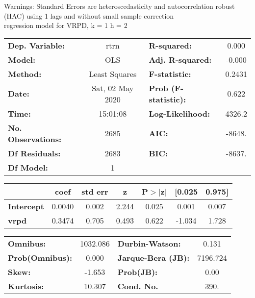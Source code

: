 Warnings: \newline
 [1] Standard Errors are heteroscedasticity and autocorrelation robust (HAC) using 1 lags and without small sample correction\\ 

regression model for VRPD, k = 1 h = 2\begin{center}
\begin{tabular}{lclc}
\toprule
\textbf{Dep. Variable:}    &       rtrn       & \textbf{  R-squared:         } &     0.000   \\
\textbf{Model:}            &       OLS        & \textbf{  Adj. R-squared:    } &    -0.000   \\
\textbf{Method:}           &  Least Squares   & \textbf{  F-statistic:       } &    0.2431   \\
\textbf{Date:}             & Sat, 02 May 2020 & \textbf{  Prob (F-statistic):} &    0.622    \\
\textbf{Time:}             &     15:01:08     & \textbf{  Log-Likelihood:    } &    4326.2   \\
\textbf{No. Observations:} &        2685      & \textbf{  AIC:               } &    -8648.   \\
\textbf{Df Residuals:}     &        2683      & \textbf{  BIC:               } &    -8637.   \\
\textbf{Df Model:}         &           1      & \textbf{                     } &             \\
\bottomrule
\end{tabular}
\begin{tabular}{lcccccc}
                   & \textbf{coef} & \textbf{std err} & \textbf{z} & \textbf{P$> |$z$|$} & \textbf{[0.025} & \textbf{0.975]}  \\
\midrule
\textbf{Intercept} &       0.0040  &        0.002     &     2.244  &         0.025        &        0.001    &        0.007     \\
\textbf{vrpd}      &       0.3474  &        0.705     &     0.493  &         0.622        &       -1.034    &        1.728     \\
\bottomrule
\end{tabular}
\begin{tabular}{lclc}
\textbf{Omnibus:}       & 1032.086 & \textbf{  Durbin-Watson:     } &    0.131  \\
\textbf{Prob(Omnibus):} &   0.000  & \textbf{  Jarque-Bera (JB):  } & 7196.724  \\
\textbf{Skew:}          &  -1.653  & \textbf{  Prob(JB):          } &     0.00  \\
\textbf{Kurtosis:}      &  10.307  & \textbf{  Cond. No.          } &     390.  \\
\bottomrule
\end{tabular}
\end{center}


